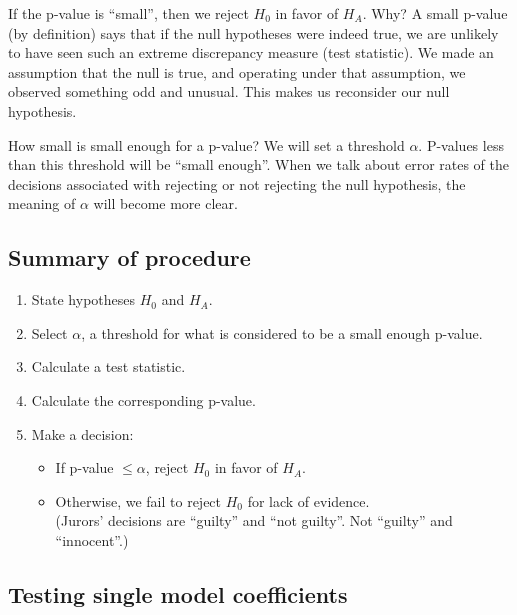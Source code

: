 \documentclass[]{book}
\providecommand{\tightlist}{%
  \setlength{\itemsep}{0pt}\setlength{\parskip}{0pt}}
\begin{document}
If the p-value is ``small'', then we reject \(H_0\) in favor of \(H_A\). Why? A small p-value (by definition) says that if the null hypotheses were indeed true, we are unlikely to have seen such an extreme discrepancy measure (test statistic). We made an assumption that the null is true, and operating under that assumption, we observed something odd and unusual. This makes us reconsider our null hypothesis.

How small is small enough for a p-value? We will set a threshold \(\alpha\). P-values less than this threshold will be ``small enough''. When we talk about error rates of the decisions associated with rejecting or not rejecting the null hypothesis, the meaning of \(\alpha\) will become more clear.

\hypertarget{summary-of-procedure}{%
\subsection{Summary of procedure}\label{summary-of-procedure}}

\begin{enumerate}
\def\labelenumi{\arabic{enumi}.}
\tightlist
\item
  State hypotheses \(H_0\) and \(H_A\).
\item
  Select \(\alpha\), a threshold for what is considered to be a small enough p-value.
\item
  Calculate a test statistic.
\item
  Calculate the corresponding p-value.
\item
  Make a decision:

  \begin{itemize}
  \tightlist
  \item
    If p-value \(\leq\alpha\), reject \(H_0\) in favor of \(H_A\).
  \item
    Otherwise, we fail to reject \(H_0\) for lack of evidence.\\
    (Jurors' decisions are ``guilty'' and ``not guilty''. Not ``guilty'' and ``innocent''.)
  \end{itemize}
\end{enumerate}

\hypertarget{testing-single-model-coefficients}{%
\subsection{Testing single model coefficients}\label{testing-single-model-coefficients}}
\end{document}
